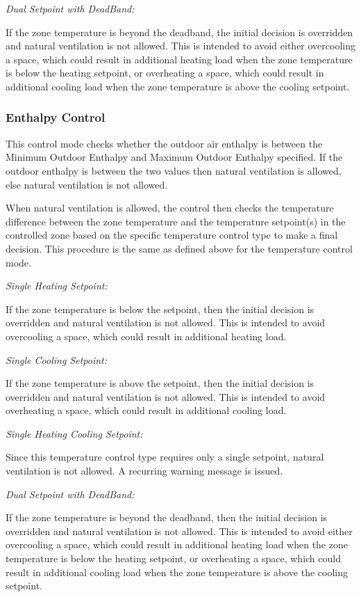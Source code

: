 \emph{Dual Setpoint with DeadBand:}

If the zone temperature is beyond the deadband, the initial decision is overridden and natural ventilation is not allowed. This is intended to avoid either overcooling a space, which could result in additional heating load when the zone temperature is below the heating setpoint, or overheating a space, which could result in additional cooling load when the zone temperature is above the cooling setpoint.

\subsubsection{Enthalpy Control}\label{enthalpy-control}

This control mode checks whether the outdoor air enthalpy is between the Minimum Outdoor Enthalpy and Maximum Outdoor Enthalpy specified. If the outdoor enthalpy is between the two values then natural ventilation is allowed, else natural ventilation is not allowed.

When natural ventilation is allowed, the control then checks the temperature difference between the zone temperature and the temperature setpoint(s) in the controlled zone based on the specific temperature control type to make a final decision. This procedure is the same as defined above for the temperature control mode.

\emph{Single Heating Setpoint:}

If the zone temperature is below the setpoint, then the initial decision is overridden and natural ventilation is not allowed. This is intended to avoid overcooling a space, which could result in additional heating load.

\emph{Single Cooling Setpoint:}

If the zone temperature is above the setpoint, then the initial decision is overridden and natural ventilation is not allowed. This is intended to avoid overheating a space, which could result in additional cooling load.

\emph{Single Heating Cooling Setpoint:}

Since this temperature control type requires only a single setpoint, natural ventilation is not allowed. A recurring warning message is issued.

\emph{Dual Setpoint with DeadBand:}

If the zone temperature is beyond the deadband, then the initial decision is overridden and natural ventilation is not allowed. This is intended to avoid either overcooling a space, which could result in additional heating load when the zone temperature is below the heating setpoint, or overheating a space, which could result in additional cooling load when the zone temperature is above the cooling setpoint.

